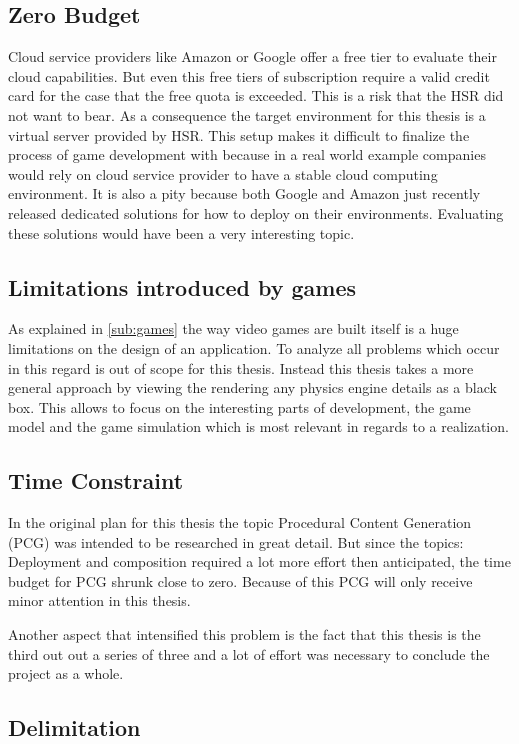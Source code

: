 \subsection{Zero Budget}
\label{sub:zero_buget}
Cloud service providers like Amazon or Google offer a free tier to evaluate
their cloud capabilities. But even this free tiers of subscription require a
valid credit card for the case that the free quota is exceeded. This is a risk
that the HSR did not want to bear. As a consequence the target environment for
this thesis is a virtual server provided by HSR. This setup makes it difficult
to finalize the process of game development with \mss{} because in a real world
example companies would rely on cloud service provider to have a stable cloud
computing environment. It is also a pity because both Google and Amazon just
recently released dedicated solutions for how to deploy \ogs{} on their
environments. Evaluating these solutions would have been a very interesting
topic.

\subsection{Limitations introduced by games}
As explained in \autoref{sub:games} the way video games are built itself is a
huge limitations on the design of an \og{} application. To analyze all problems
which occur in this regard is out of scope for this thesis. Instead this thesis
takes a more general approach by viewing the rendering any physics engine
details as a black box. This allows to focus on the interesting parts of \og{}
development, the game model and the game simulation which is most relevant in
regards to a \ms{} realization.

\subsection{Time Constraint}
In the original plan for this thesis the topic Procedural Content Generation
(PCG) was intended to be researched in great detail. But since the topics:
Deployment and composition required a lot more effort then anticipated, the time
budget for PCG shrunk close to zero. Because of this PCG will only receive minor
attention in this thesis.

Another aspect that intensified this problem is the fact that this thesis is the
third out out a series of three and a lot of effort was necessary to conclude
the project as a whole.

\subsection{Delimitation}

